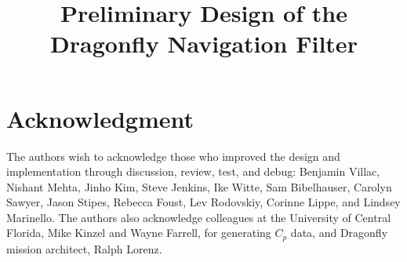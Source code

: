 \documentclass[letterpaper, preprint, paper,10pt]{AAS}	%
\begin{document}
\title{Preliminary Design of the \\ Dragonfly Navigation Filter}



\maketitle{} 		








\section{Acknowledgment}
The authors wish to acknowledge those who improved the design and implementation through discussion, review, test, and debug: Benjamin Villac, Nishant Mehta, Jinho Kim, Steve Jenkins, Ike Witte, Sam Bibelhauser, Carolyn Sawyer, Jason Stipes, Rebecca Foust, Lev Rodovskiy, Corinne Lippe, and Lindsey Marinello. The authors also acknowledge colleagues at the University of Central Florida, Mike Kinzel and Wayne Farrell, for generating $C_{p}$ data, and Dragonfly mission architect, Ralph Lorenz.  

\end{document}
